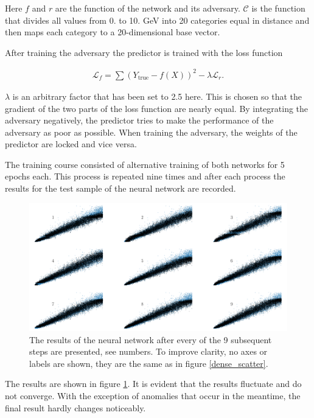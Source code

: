 \documentclass[12pt, a4paper]{thesis}
\begin{document}
Here \(f\) and \(r\) are the function of the network and its
adversary. \(\mathcal{C}\) is the function that divides all values
from 0. to 10. GeV into 20 categories equal in distance and then maps
each category to a 20-dimensional base vector.

After training the adversary the predictor is trained with the loss
function

\begin{align}
\mathcal{L}_f = \sum (Y_{\text{true}} - f(X))^2 - \lambda
\mathcal{L}_r.
\end{align}

\(\lambda\) is an arbitrary factor that has been set to 2.5 here. This
is chosen so that the gradient of the two parts of the loss function
are nearly equal. By integrating the adversary negatively, the
predictor tries to make the performance of the adversary as poor as
possible. When training the adversary, the weights of the predictor
are locked and vice versa.

The training course consisted of alternative training of both networks
for 5 epochs each. This process is repeated nine times and after each
process the results for the test sample of the neural network are
recorded.

\begin{figure}[hbtp]
\centering
\includegraphics[width=.9\linewidth]{../images/adv_scatter.png}
\caption{ The results of the neural network after every of the 9
  subsequent steps are presented, see numbers. To improve clarity, no
  axes or labels are shown, they are the same as in figure
  \ref{dense_scatter}.}
\label{adv_scatter}
\end{figure}

The results are shown in figure \ref{adv_scatter}.  It is evident that
the results fluctuate and do not converge. With the exception of
anomalies that occur in the meantime, the final result hardly changes
noticeably.
\end{document}
